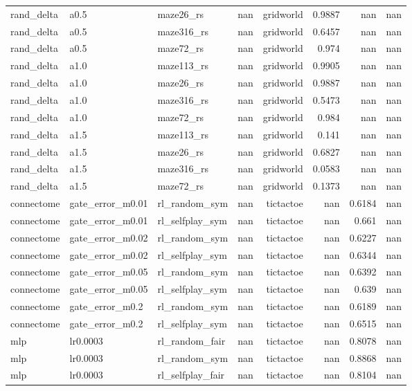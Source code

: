 \begin{table}[t]
\begin{tabular}{lllrrrrr}
rand\_delta & a0.5 & maze26\_rs & nan & gridworld & 0.9887 & nan & nan \\
rand\_delta & a0.5 & maze316\_rs & nan & gridworld & 0.6457 & nan & nan \\
rand\_delta & a0.5 & maze72\_rs & nan & gridworld & 0.974 & nan & nan \\
rand\_delta & a1.0 & maze113\_rs & nan & gridworld & 0.9905 & nan & nan \\
rand\_delta & a1.0 & maze26\_rs & nan & gridworld & 0.9887 & nan & nan \\
rand\_delta & a1.0 & maze316\_rs & nan & gridworld & 0.5473 & nan & nan \\
rand\_delta & a1.0 & maze72\_rs & nan & gridworld & 0.984 & nan & nan \\
rand\_delta & a1.5 & maze113\_rs & nan & gridworld & 0.141 & nan & nan \\
rand\_delta & a1.5 & maze26\_rs & nan & gridworld & 0.6827 & nan & nan \\
rand\_delta & a1.5 & maze316\_rs & nan & gridworld & 0.0583 & nan & nan \\
rand\_delta & a1.5 & maze72\_rs & nan & gridworld & 0.1373 & nan & nan \\
connectome & gate\_error\_m0.01 & rl\_random\_sym & nan & tictactoe & nan & 0.6184 & nan \\
connectome & gate\_error\_m0.01 & rl\_selfplay\_sym & nan & tictactoe & nan & 0.661 & nan \\
connectome & gate\_error\_m0.02 & rl\_random\_sym & nan & tictactoe & nan & 0.6227 & nan \\
connectome & gate\_error\_m0.02 & rl\_selfplay\_sym & nan & tictactoe & nan & 0.6344 & nan \\
connectome & gate\_error\_m0.05 & rl\_random\_sym & nan & tictactoe & nan & 0.6392 & nan \\
connectome & gate\_error\_m0.05 & rl\_selfplay\_sym & nan & tictactoe & nan & 0.639 & nan \\
connectome & gate\_error\_m0.2 & rl\_random\_sym & nan & tictactoe & nan & 0.6189 & nan \\
connectome & gate\_error\_m0.2 & rl\_selfplay\_sym & nan & tictactoe & nan & 0.6515 & nan \\
mlp & lr0.0003 & rl\_random\_fair & nan & tictactoe & nan & 0.8078 & nan \\
mlp & lr0.0003 & rl\_random\_sym & nan & tictactoe & nan & 0.8868 & nan \\
mlp & lr0.0003 & rl\_selfplay\_fair & nan & tictactoe & nan & 0.8104 & nan \\

\end{tabular}
\end{table}
